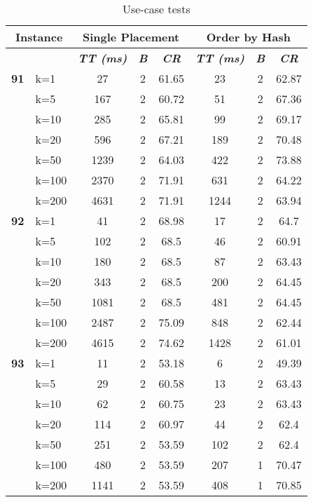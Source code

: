     \begin{table}[htbp]
    \caption{Use-case tests}
    \begin{tabular}{|l|l|c|c|c|c|c|c|}
    
    \multicolumn{ 2}{|c|}{\textbf{Instance}} & \multicolumn{ 3}{c|}{\textbf{Single Placement}} & \multicolumn{ 3}{c|}{\textbf{Order by Hash}} \\ \hline
    \multicolumn{ 2}{|l|}{} & \textbf{\textit{TT (ms)}} & \textbf{\textit{B}} & \textbf{\textit{CR}} & \textbf{\textit{TT (ms)}} & \textbf{\textit{B}} & \textbf{\textit{CR}} \\ \hline
    \multicolumn{1}{|r|}{\textbf{91}} & k=1 & 27 & 2 & 61.65 & 23 & 2 & 62.87 \\ 
     & k=5 & 167 & 2 & 60.72 & 51 & 2 & 67.36 \\ 
     & k=10 & 285 & 2 & 65.81 & 99 & 2 & 69.17 \\ 
     & k=20 & 596 & 2 & 67.21 & 189 & 2 & 70.48 \\ 
     & k=50 & 1239 & 2 & 64.03 & 422 & 2 & 73.88 \\ 
     & k=100 & 2370 & 2 & 71.91 & 631 & 2 & 64.22 \\ 
     & k=200 & 4631 & 2 & 71.91 & 1244 & 2 & 63.94 \\ \hline
    \multicolumn{1}{|r|}{\textbf{92}} & k=1 & 41 & 2 & 68.98 & 17 & 2 & 64.7 \\ 
     & k=5 & 102 & 2 & 68.5 & 46 & 2 & 60.91 \\ 
     & k=10 & 180 & 2 & 68.5 & 87 & 2 & 63.43 \\ 
     & k=20 & 343 & 2 & 68.5 & 200 & 2 & 64.45 \\ 
     & k=50 & 1081 & 2 & 68.5 & 481 & 2 & 64.45 \\ 
     & k=100 & 2487 & 2 & 75.09 & 848 & 2 & 62.44 \\ 
     & k=200 & 4615 & 2 & 74.62 & 1428 & 2 & 61.01 \\ \hline
    \multicolumn{1}{|r|}{\textbf{93}} & k=1 & 11 & 2 & 53.18 & 6 & 2 & 49.39 \\ 
     & k=5 & 29 & 2 & 60.58 & 13 & 2 & 63.43 \\ 
     & k=10 & 62 & 2 & 60.75 & 23 & 2 & 63.43 \\ 
     & k=20 & 114 & 2 & 60.97 & 44 & 2 & 62.4 \\ 
     & k=50 & 251 & 2 & 53.59 & 102 & 2 & 62.4 \\ 
     & k=100 & 480 & 2 & 53.59 & 207 & 1 & 70.47 \\ 
     & k=200 & 1141 & 2 & 53.59 & 408 & 1 & 70.85 \\ \hline

\end{tabular}
\end{table}
